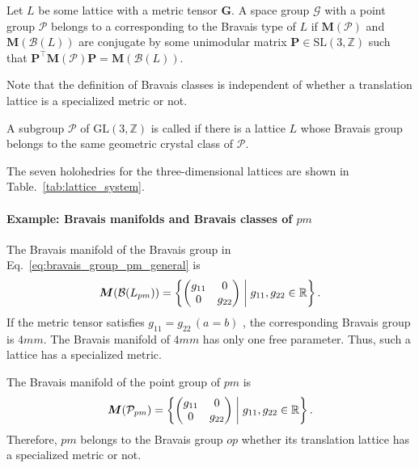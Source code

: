 \begin{screen}
  \begin{defn}
    Let $L$ be some lattice with a metric tensor $\bm{G}$.
    A space group $\mathcal{G}$ with a point group $\mathcal{P}$ belongs to a  corresponding to the Bravais type of $L$ if $\bm{M}(\mathcal{P})$ and $\bm{M}(\mathcal{B}(L))$ are conjugate by some unimodular matrix $\bm{P} \in \mathrm{SL}(3, \mathbb{Z})$ such that $\bm{P}^{\top} \bm{M}(\mathcal{P}) \bm{P} = \bm{M}(\mathcal{B}(L))$.
  \end{defn}
\end{screen}

Note that the definition of Bravais classes is independent of whether a translation lattice is a specialized metric or not.

\begin{screen}
  \begin{defn}[holohedry]
    A subgroup $\mathcal{P}$ of $\mathrm{GL}(3, \mathbb{Z})$ is called  if there is a lattice $L$ whose Bravais group belongs to the same geometric crystal class of $\mathcal{P}$.
  \end{defn}
\end{screen}

The seven holohedries for the three-dimensional lattices are shown in Table.~\ref{tab:lattice_system}.

\paragraph{Example: Bravais manifolds and Bravais classes of $pm$}

The Bravais manifold of the Bravais group in Eq.~\eqref{eq:bravais_group_pm_general} is
\begin{align*}
  \bm{M}(\mathcal{B}(L_{pm})) = \left\{ 
    \begin{pmatrix} g_{11} & 0 \\ 0 & g_{22} \end{pmatrix}
   \mathrel{}\middle|\mathrel{} 
    g_{11}, g_{22} \in \mathbb{R}
   \right\}.
\end{align*}
If the metric tensor satisfies $g_{11} = g_{22} \, (a = b)$ , the corresponding Bravais group is $4mm$.
The Bravais manifold of $4mm$ has only one free parameter.
Thus, such a lattice has a specialized metric.

The Bravais manifold of the point group of $pm$ is
\begin{align*}
  \bm{M}(\mathcal{P}_{pm}) = \left\{ 
    \begin{pmatrix} g_{11} & 0 \\ 0 & g_{22} \end{pmatrix}
   \mathrel{}\middle|\mathrel{} 
    g_{11}, g_{22} \in \mathbb{R}
   \right\}.
\end{align*}
Therefore, $pm$ belongs to the Bravais group $op$ whether its translation lattice has a specialized metric or not.

